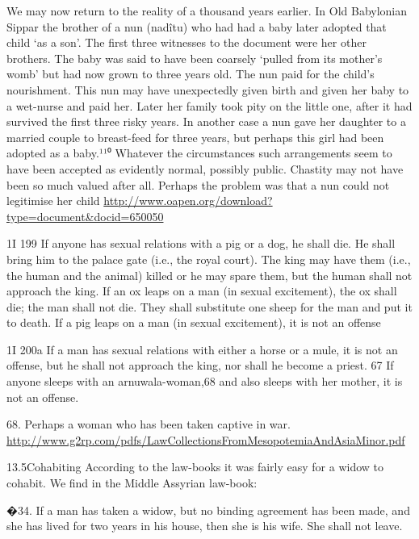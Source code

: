 \documentclass[11pt]{article}
\begin{document}
\medskip
\begin{thebibliography}{56}
We may now return to the reality of a thousand years earlier. In Old Babylonian Sippar the brother of a nun (nadîtu) who had had a baby later adopted that child ‘as a son’. The first three witnesses to the document were her other brothers. The baby was said to have been coarsely ‘pulled from its mother’s womb’ but had now grown to three years old. The nun paid for the child’s nourishment. This nun may have unexpectedly given birth and given her baby to a wet-nurse and paid her.
Later her family took pity on the little one, after it had survived the first three risky years. In another case a nun gave her daughter to a married couple to breast-feed for three years, but perhaps this girl had been adopted as a baby.¹¹⁰ Whatever the circumstances such arrangements seem to have been accepted as evidently normal, possibly public. Chastity may not have been so much valued after all.
Perhaps the problem was that a nun could not legitimise her child
\url{http://www.oapen.org/download?type=document&docid=650050}

1I 199 If anyone has sexual relations with a pig or a dog, he shall die. He shall
bring him to the palace gate (i.e., the royal court). The king may have them
(i.e., the human and the animal) killed or he may spare them, but the human
shall not approach the king. If an ox leaps on a man (in sexual excitement),
the ox shall die; the man shall not die. They shall substitute one sheep for
the man and put it to death. If a pig leaps on a man (in sexual excitement), it
is not an offense


1I 200a If a man has sexual relations with either a horse or a mule, it is not
an offense, but he shall not approach the king, nor shall he become a
priest. 67 If anyone sleeps with an arnuwala-woman,68 and also sleeps with
her mother, it is not an offense. 


68. Perhaps a woman who has been taken captive in war. 
\url{http://www.g2rp.com/pdfs/LawCollectionsFromMesopotemiaAndAsiaMinor.pdf}


13.5Cohabiting
According to the law-books it was fairly easy for a widow to cohabit. We find in
the Middle Assyrian law-book:

      �34. If a man has taken a widow, but no binding agreement has been made, and she has
      lived for two years in his house, then she is his wife. She shall not leave.


\end{thebibliography}
\end{document}
